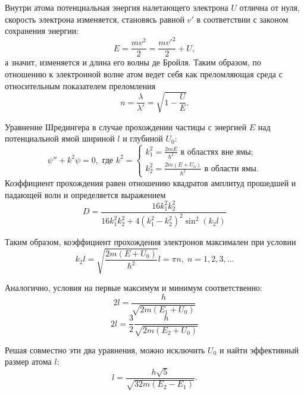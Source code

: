 	Внутри атома потенциальная энергия налетающего электрона $U$ отлична от нуля, скорость электрона изменяется, становясь равной $v'$ в соответствии с законом сохранения энергии:
	\begin{equation}
		E = \frac{mv^2}{2} = \frac{mv'^2}{2} + U,
	\end{equation}
	а значит, изменяется и длина его волны де Бройля. Таким образом, по отношению к электронной волне атом ведет себя как преломляющая среда с относительным показателем преломления
	\begin{equation}
		n = \frac{\lambda}{\lambda'} = \sqrt{1-\frac{U}{E}}.
	\end{equation}

	Уравнение Шредингера в случае прохождении частицы с энергией $E$ над потенциальной ямой шириной $l$ и глубиной $U_0$:
	\begin{equation}
		\psi'' + k^2 \psi = 0, \text{ где } k^2 = \begin{cases*}
			k_1^2 = \frac{2mE}{\hbar^2} \text{ в областях вне ямы;} \\
			k_2^2 = \frac{2m(E + U_0)}{\hbar^2} \text{ в области ямы.}
		\end{cases*} 
	\end{equation}
	Коэффициент прохождения равен отношению квадратов амплитуд прошедшей и падающей волн и определяется выражением
	\begin{equation}
		D = \frac{16 k_1^2 k_2^2}{16 k_1^2 k_2^2 + 4(k_1^2 - k_2^2)^2 \sin^2{(k_2 l)}}
	\end{equation}
	
	Таким образом, коэффициент прохождения электронов максимален при условии
	\begin{equation}
		k_2 l = \sqrt{\frac{2m(E + U_0)}{\hbar^2}}l = \pi n, \; n = 1, 2, 3, ...
		\label{En}
	\end{equation}
	
	Аналогично, условия на первые максимум и минимум соответственно:
	\begin{equation}
		2l = \frac{h}{\sqrt{2m(E_1 + U_0)}}
		\label{E1}
	\end{equation}
	\begin{equation}
		2l = \frac{3}{2}\frac{h}{\sqrt{2m(E_2 + U_0)}}
		\label{E2}
	\end{equation}
	
	Решая совместно эти два уравнения, можно исключить $U_0$ и найти эффективный размер атома $l$:
	\begin{equation}
		l = \frac{h\sqrt{5}}{\sqrt{32m(E_2 - E_1)}}.
		\label{E2E1}
	\end{equation}

